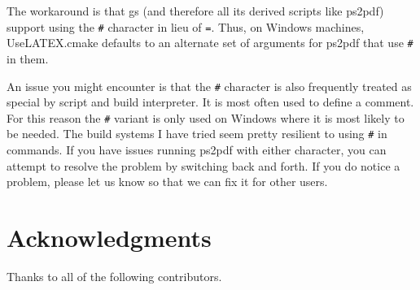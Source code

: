 \documentclass{article}
\newcommand*{\textfile}[1]{\textsf{#1}}
\newcommand*{\textprog}[1]{\textfile{#1}}
\newcommand*{\textcmake}[1]{\texttt{#1}}
\newcommand*{\UseLATEX}{\textfile{UseLATEX.cmake}\xspace}
\begin{document}
  The workaround is that \textprog{gs} (and therefore all its derived scripts like \textprog{ps2pdf}) support using the \textcmake{\#} character in lieu of \textcmake{=}.
  Thus, on Windows machines, \UseLATEX defaults to an alternate set of arguments for \textprog{ps2pdf} that use \textcmake{\#} in them.

  An issue you might encounter is that the \textcmake{\#} character is also frequently treated as special by script and build interpreter.
  It is most often used to define a comment.
  For this reason the \textcmake{\#} variant is only used on Windows where it is most likely to be needed.
  The build systems I have tried seem pretty resilient to using \textcmake{\#} in commands.
  If you have issues running \textprog{ps2pdf} with either character, you can attempt to resolve the problem by switching back and forth.
  If you do notice a problem, please let us know so that we can fix it for other users.



  \section{Acknowledgments}

  Thanks to all of the following contributors.
\end{document}

